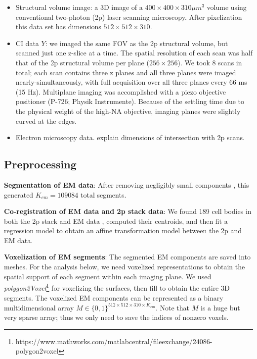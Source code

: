\documentclass[10pt,letterpaper]{article}
\begin{document}
\begin{itemize}
	\item Structural volume image: a 3D image of a $400\times 400\times 310\mu m^3$ volume using conventional two-photon (2p) laser scanning microscopy.  After pixelization this data set has dimensions $512\times 512 \times 310$.
	\item CI data $Y$:     we imaged the same FOV as the 2p structural volume, but scanned just one z-slice at a time. The spatial resolution of each scan was half that of the 2p structural volume per plane ($256\times 256$).  We took 8 scans in total; each scan contains three z planes and all three planes were imaged nearly-simultaneously, with full acquisition over all three planes every 66 ms (15 Hz). Multiplane imaging was accomplished with a piezo objective positioner (P-726; Physik Instrumente). Because of the settling time due to the physical weight of the high-NA objective, imaging planes were slightly curved at the edges.
	\item Electron microscopy data.  explain dimensions of intersection with 2p scans. 
\end{itemize}


\subsection{Preprocessing}

\textbf{Segmentation of EM data}:   After removing negligibly small components , this generated $K_{em}=109084$ total segments. %
\bigbreak

\noindent\textbf{Co-registration of EM data and 2p stack data}: We found 189 cell bodies in both the 2p stack and EM data , computed their centroids, and then fit a regression model to obtain an affine transformation model between the 2p and EM data. 
\bigbreak

\noindent\textbf{Voxelization of EM segments}: The segmented EM components are saved into meshes. For the  analysis below, we need voxelized representations to obtain the spatial support of each segment within each imaging plane. We used {\it polygon2Voxel}\footnote{https://www.mathworks.com/matlabcentral/fileexchange/24086-polygon2voxel} for voxelizing the surfaces, then fill to obtain the entire 3D segments.  The voxelized EM components can be represented as a binary multidimensional array $M\in \{0, 1\}^{512\times 512\times 310 \times K_{em}}$. Note that $M$ is a huge but very sparse array; thus we only need to save the indices of nonzero voxels.
\bigbreak
\end{document}
